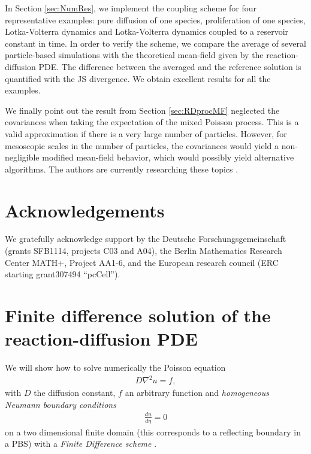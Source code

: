 \documentclass[10pt,twocolumn]{revtex4-1}
\begin{document}
	In Section \ref{sec:NumRes}, we implement the coupling scheme for four representative examples: pure diffusion of one species, proliferation of one species, Lotka-Volterra dynamics and Lotka-Volterra dynamics coupled to a reservoir constant in time. In order to verify the scheme, we compare the average of several particle-based simulations with the theoretical mean-field given by the reaction-diffusion PDE. The difference between the averaged and the reference solution is quantified with the JS divergence. We obtain excellent results for all the examples.
	
	We finally point out the result from Section \ref{sec:RDprocMF} neglected the covariances when taking the expectation of the mixed Poisson process. This is a valid approximation if there is a very large number of particles. However, for mesoscopic scales in the number of particles, the covariances would yield a non-negligible modified mean-field behavior, which would possibly yield alternative algorithms. The authors are currently researching these topics \cite{kostreHydrolimit}.
	
	\section{Acknowledgements \label{sec:ack} }
	We gratefully acknowledge support by the Deutsche Forschungsgemeinschaft (grants SFB1114, projects C03 and A04), the Berlin Mathematics Research Center MATH+, Project AA1-6, and the European research council (ERC starting grant307494 ``pcCell''). 
	
	
	
	
	
	\renewcommand{\thesection}{\Alph{section}} 
	
	\appendix
	
	
	
	\section{Finite difference solution of the reaction-diffusion PDE}\label{sec:AppendixA}
	
	We will show how to solve numerically the Poisson equation 
	\begin{align*}
	D \nabla^2 u=f,
	\end{align*}
	with $D$ the diffusion constant, $f$ an arbitrary function and \textit{homogeneous Neumann boundary conditions}
	\begin{align*}
	\frac{du}{d\eta}=0
	\end{align*}    
	on a two dimensional finite domain (this corresponds to a reflecting boundary in a PBS) with a \textit{Finite Difference scheme} \cite{deuflhard2011numerische}.
	
\end{document}
